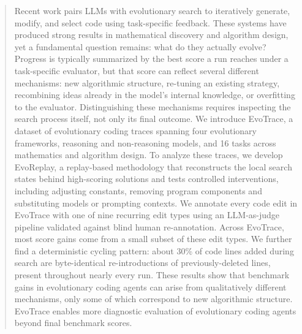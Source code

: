 \begin{abstract}
Recent work pairs LLMs with evolutionary search to iteratively generate, modify, and select code using task-specific feedback. 
These systems have produced strong results in mathematical discovery and algorithm design, yet a fundamental question remains: what do they actually evolve? 
Progress is typically summarized by the best score a run reaches under a task-specific evaluator, but that score can reflect several different mechanisms: new algorithmic structure, re-tuning an existing strategy, recombining ideas already in the model's internal knowledge, or overfitting to the evaluator. 
Distinguishing these mechanisms requires inspecting the search process itself, not only its final outcome. 
We introduce EvoTrace, a dataset of evolutionary coding traces spanning four evolutionary frameworks, reasoning and non-reasoning models, and 16 tasks across mathematics and algorithm design. 
To analyze these traces, we develop EvoReplay, a replay-based methodology that reconstructs the local search states behind high-scoring solutions and tests controlled interventions, including adjusting constants, removing program components and substituting models or prompting contexts. 
We annotate every code edit in EvoTrace with one of nine recurring edit types using an LLM-as-judge pipeline validated against blind human re-annotation.
Across EvoTrace, most score gains come from a small subset of these edit types. We further find a deterministic cycling pattern: about 30\% of code lines added during search are byte-identical re-introductions of previously-deleted lines, present throughout nearly every run.
These results show that benchmark gains in evolutionary coding agents can arise from qualitatively different mechanisms, only some of which correspond to new algorithmic structure. EvoTrace enables more diagnostic evaluation of evolutionary coding agents beyond final benchmark scores.
\end{abstract}